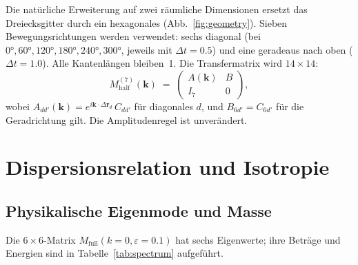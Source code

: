 \documentclass[twocolumn,showpacs,preprintnumbers,amsmath,amssymb]{revtex4-2}
\newcommand{\eps}{\varepsilon}
\begin{document}
Die natürliche Erweiterung auf zwei räumliche Dimensionen ersetzt das
Dreiecksgitter durch ein hexagonales (Abb.~\ref{fig:geometry}).
Sieben Bewegungsrichtungen werden verwendet: sechs diagonal (bei
$0°, 60°, 120°, 180°, 240°, 300°$, jeweils mit $\Delta t = 0.5$)
und eine geradeaus nach oben ($\Delta t = 1.0$).
Alle Kantenlängen bleiben~1.  Die Transfermatrix wird $14\times 14$:
\begin{equation}
  M_{\mathrm{half}}^{(7)}(\mathbf{k}) \;=\;
  \begin{pmatrix} A(\mathbf{k}) & B \\ I_7 & 0 \end{pmatrix},
  \label{eq:TM14}
\end{equation}
wobei $A_{dd'}(\mathbf{k}) = e^{i\mathbf{k}\cdot\Delta\mathbf{r}_d}\,C_{dd'}$
für diagonales $d$, und $B_{6d'} = C_{6d'}$ für die Geradrichtung gilt.
Die Amplitudenregel ist unverändert.

\section{Dispersionsrelation und Isotropie}
\label{sec:dispersion}

\subsection{Physikalische Eigenmode und Masse}

Die $6\times 6$-Matrix $M_{\mathrm{full}}(k{=}0, \eps{=}0.1)$ hat sechs
Eigenwerte; ihre Beträge und Energien sind in
Tabelle~\ref{tab:spectrum} aufgeführt.
\end{document}
